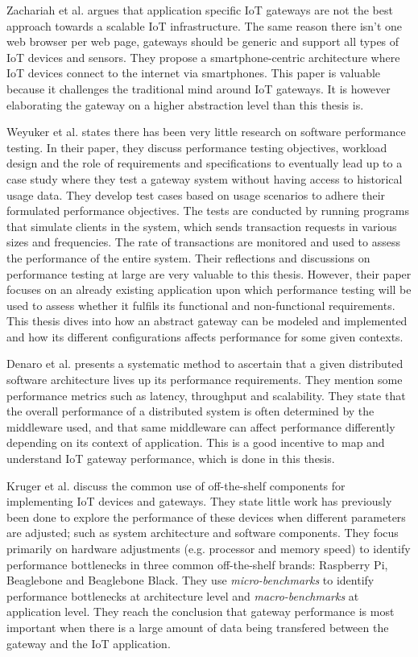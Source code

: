 Zachariah et al. \cite{zachariah2015internet} argues that application specific
IoT gateways are not the best approach towards a scalable IoT infrastructure.
The same reason there isn't one web browser per web page, gateways should be
generic and support all types of IoT devices and sensors. They propose a
smartphone-centric architecture where IoT devices connect to the internet via
smartphones. This paper is valuable because it challenges the traditional mind
around IoT gateways. It is however elaborating the gateway on a higher
abstraction level than this thesis is.

Weyuker et al. \cite{weyuker2000experience} states there has been very little
research on software performance testing. In their paper, they discuss
performance testing objectives, workload design and the role of requirements
and specifications to eventually lead up to a case study where they test a
gateway system without having access to historical usage data. They develop
test cases based on usage scenarios to adhere their formulated performance
objectives. The tests are conducted by running programs that simulate clients
in the system, which sends transaction requests in various sizes and
frequencies. The rate of transactions are monitored and used to assess the
performance of the entire system. Their reflections and discussions on
performance testing at large are very valuable to this thesis. However, their
paper focuses on an already existing application upon which performance testing
will be used to assess whether it fulfils its functional and non-functional
requirements. This thesis dives into how an abstract gateway can be modeled and
implemented and how its different configurations affects performance for some
given contexts.

Denaro et al. \cite{denaro2005performance} presents a systematic method to
ascertain that a given distributed software architecture lives up its
performance requirements. They mention some performance metrics such as
latency, throughput and scalability. They state that the overall performance of
a distributed system is often determined by the middleware used, and that same
middleware can affect performance differently depending on its context of
application. This is a good incentive to map and understand IoT gateway
performance, which is done in this thesis.

Kruger et al. \cite{kruger2014benchmarking} discuss the common use of
off-the-shelf components for implementing IoT devices and gateways. They state
little work has previously been done to explore the performance of these
devices when different parameters are adjusted; such as system architecture and
software components. They focus primarily on hardware adjustments (e.g.
processor and memory speed) to identify performance bottlenecks in three common
off-the-shelf brands: Raspberry Pi, Beaglebone and Beaglebone Black. They use
\textit{micro-benchmarks} to identify performance bottlenecks at architecture
level and \textit{macro-benchmarks} at application level. They reach the
conclusion that gateway performance is most important when there is a large
amount of data being transfered between the gateway and the IoT application.

